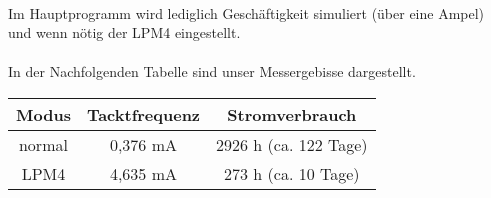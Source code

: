 

\paragraph*{}
Im Hauptprogramm wird lediglich Geschäftigkeit simuliert (über eine Ampel) und wenn nötig der LPM4 eingestellt. \\



\paragraph*{}
In der Nachfolgenden Tabelle sind unser Messergebisse dargestellt. \\

\begin{tabular}{ c | c | c }\hline \hline
Modus & Tacktfrequenz & Stromverbrauch \\ \hline
normal & 0,376 mA & 2926 h (ca. 122 Tage) \\ \hline
LPM4 & 4,635 mA & 273 h (ca. 10 Tage) \\ \hline
\end{tabular}



